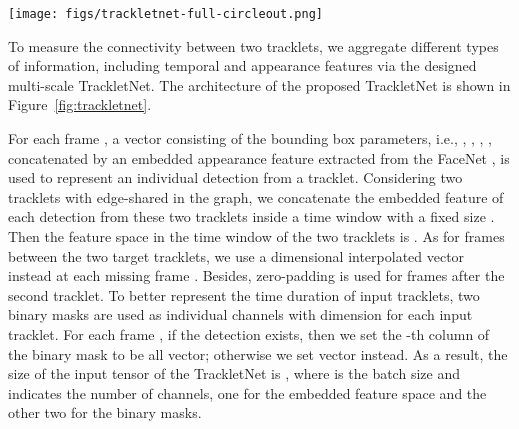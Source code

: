 \documentclass[10pt,twocolumn,letterpaper]{article}
\begin{document}
\begin{figure*}
\begin{center}
\texttt{[image: figs/trackletnet-full-circleout.png]}
\end{center}
   \caption{Architecture of Multi-scale TrackletNet. 
   First, we extract embedded features from two input tracklets, which include  location features and  appearance features along the time window of  frames.
   The input tensor has three channels, i.e., one for tracklet embedded features and the other two for binary masks, where white color represents 1 and black color represents 0. Four types of  convolution kernels are applied for feature extraction in three convolution layers. 
For each convolution layer, max pooling is adopted for down-sampling in the time domain. Average pooling is conducted on the dimensions of the appearance feature after \texttt{Conv3}. Then two fully connected layers are conducted to get the final output. 
}
\label{fig:trackletnet}
\end{figure*}



To measure the connectivity between two tracklets,
we aggregate different types of information, including temporal and appearance features via the designed multi-scale TrackletNet. 
The architecture of the proposed TrackletNet is shown in Figure~\ref{fig:trackletnet}.

For each frame , a vector consisting of the bounding box parameters, i.e., , , , , concatenated by an embedded appearance feature extracted from the FaceNet \cite{schroff2015facenet}, is used to represent an individual detection from a tracklet. Considering two tracklets with edge-shared in the graph, we concatenate the embedded feature of each detection from these two tracklets inside a time window with a fixed size . Then the feature space in the time window of the two tracklets is . As for frames between the two target tracklets, we use a  dimensional interpolated vector instead at each missing frame . Besides, zero-padding is used for frames after the second tracklet. 
To better represent the time duration of input tracklets, two binary masks are used as individual channels with  dimension for each input tracklet. For each frame , if the detection exists, then we set the -th column of the binary mask to be all  vector; otherwise we set  vector instead. 
As a result, the size of the input tensor of the TrackletNet is , where  is the batch size and  indicates the number of channels, one for the embedded feature space and the other two for the binary masks. 
\end{document}
